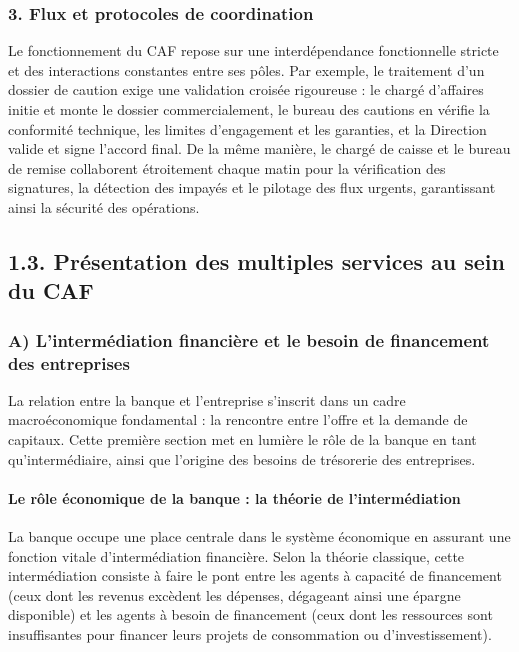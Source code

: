 \documentclass[12pt,a4paper]{report}
\begin{document}
\subsubsection*{3. Flux et protocoles de coordination}

Le fonctionnement du CAF repose sur une interdépendance fonctionnelle stricte et des interactions constantes entre ses pôles. Par exemple, le traitement d'un dossier de caution exige une validation croisée rigoureuse : le chargé d'affaires initie et monte le dossier commercialement, le bureau des cautions en vérifie la conformité technique, les limites d'engagement et les garanties, et la Direction valide et signe l'accord final. De la même manière, le chargé de caisse et le bureau de remise collaborent étroitement chaque matin pour la vérification des signatures, la détection des impayés et le pilotage des flux urgents, garantissant ainsi la sécurité des opérations.

\subsection*{1.3. Présentation des multiples services au sein du CAF}

\subsubsection*{A) L'intermédiation financière et le besoin de financement des entreprises}

La relation entre la banque et l'entreprise s'inscrit dans un cadre macroéconomique fondamental : la rencontre entre l'offre et la demande de capitaux. Cette première section met en lumière le rôle de la banque en tant qu'intermédiaire, ainsi que l'origine des besoins de trésorerie des entreprises.

\paragraph{Le rôle économique de la banque : la théorie de l'intermédiation}

La banque occupe une place centrale dans le système économique en assurant une fonction vitale d'intermédiation financière. Selon la théorie classique, cette intermédiation consiste à faire le pont entre les agents à capacité de financement (ceux dont les revenus excèdent les dépenses, dégageant ainsi une épargne disponible) et les agents à besoin de financement (ceux dont les ressources sont insuffisantes pour financer leurs projets de consommation ou d'investissement).
\end{document}
